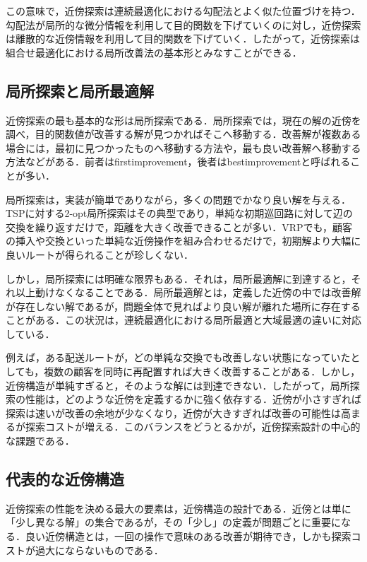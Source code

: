 この意味で，近傍探索は連続最適化における勾配法とよく似た位置づけを持つ．勾配法が局所的な微分情報を利用して目的関数を下げていくのに対し，近傍探索は離散的な近傍情報を利用して目的関数を下げていく．したがって，近傍探索は組合せ最適化における局所改善法の基本形とみなすことができる．

\subsection{局所探索と局所最適解}

近傍探索の最も基本的な形は局所探索である．局所探索では，現在の解の近傍を調べ，目的関数値が改善する解が見つかればそこへ移動する．改善解が複数ある場合には，最初に見つかったものへ移動する方法や，最も良い改善解へ移動する方法などがある．前者はfirstimprovement，後者はbestimprovementと呼ばれることが多い．

局所探索は，実装が簡単でありながら，多くの問題でかなり良い解を与える．TSPに対する2-opt局所探索はその典型であり，単純な初期巡回路に対して辺の交換を繰り返すだけで，距離を大きく改善できることが多い．VRPでも，顧客の挿入や交換といった単純な近傍操作を組み合わせるだけで，初期解より大幅に良いルートが得られることが珍しくない．

しかし，局所探索には明確な限界もある．それは，局所最適解に到達すると，それ以上動けなくなることである．局所最適解とは，定義した近傍の中では改善解が存在しない解であるが，問題全体で見ればより良い解が離れた場所に存在することがある．この状況は，連続最適化における局所最適と大域最適の違いに対応している．

例えば，ある配送ルートが，どの単純な交換でも改善しない状態になっていたとしても，複数の顧客を同時に再配置すれば大きく改善することがある．しかし，近傍構造が単純すぎると，そのような解には到達できない．したがって，局所探索の性能は，どのような近傍を定義するかに強く依存する．近傍が小さすぎれば探索は速いが改善の余地が少なくなり，近傍が大きすぎれば改善の可能性は高まるが探索コストが増える．このバランスをどうとるかが，近傍探索設計の中心的な課題である．

\subsection{代表的な近傍構造}

近傍探索の性能を決める最大の要素は，近傍構造の設計である．近傍とは単に「少し異なる解」の集合であるが，その「少し」の定義が問題ごとに重要になる．良い近傍構造とは，一回の操作で意味のある改善が期待でき，しかも探索コストが過大にならないものである．

